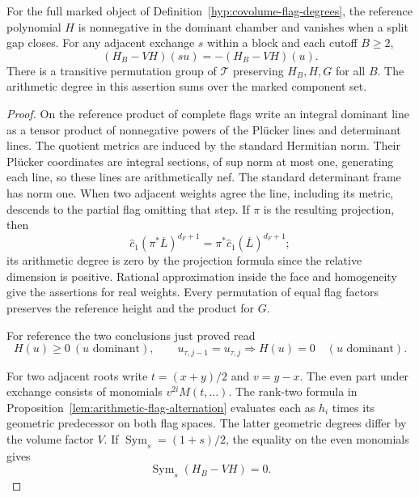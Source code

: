 \begin{established}\label{hyp:flag-wall-symmetry}
For the full marked object of Definition~\ref{hyp:covolume-flag-degrees}, the reference polynomial \(H\) is nonnegative in the dominant chamber and vanishes when a split gap closes. For any adjacent exchange \(s\) within a block and each cutoff \(B\ge2\),
\[
       (H_B-VH)(su)=-(H_B-VH)(u).
\]
There is a transitive permutation group of \(\mathcal T\) preserving \(H_B,H,G\) for all \(B\). The arithmetic degree in this assertion sums over the marked component set.
\label{cor:covolume-wall-shape-2}
\end{established}
\begin{proof}
On the reference product of complete flags write an integral dominant line as a tensor product of nonnegative powers of the Pl\"ucker lines and determinant lines. The quotient metrics are induced by the standard Hermitian norm. Their Pl\"ucker coordinates are integral sections, of sup norm at most one, generating each line, so these lines are arithmetically nef. The standard determinant frame has norm one. When two adjacent weights agree the line, including its metric, descends to the partial flag omitting that step. If \(\pi\) is the resulting projection, then
\[
 \widehat c_1(\pi^*\overline L)^{d_F+1}
           =\pi^*\widehat c_1(\overline L)^{d_F+1};
\]
its arithmetic degree is zero by the projection formula since the relative dimension is positive. Rational approximation inside the face and homogeneity give the assertions for real weights. Every permutation of equal flag factors preserves the reference height and the product for \(G\).

For reference the two conclusions just proved read
\[
       H(u)\ge0\ (u\text{ dominant}),\qquad
       u_{\tau,j-1}=u_{\tau,j}\Longrightarrow H(u)=0
       \quad(u\text{ dominant}).
\]

For two adjacent roots write \(t=(x+y)/2\) and \(v=y-x\). The even part under exchange consists of monomials \(v^{2i}M(t,\ldots)\). The rank-two formula in Proposition~\ref{lem:arithmetic-flag-alternation} evaluates each as \(h_i\) times its geometric predecessor on both flag spaces. The latter geometric degrees differ by the volume factor \(V\). If \(\operatorname{Sym}_s=(1+s)/2\), the equality on the even monomials gives
\[
             \operatorname{Sym}_s(H_B-VH)=0 .
\]


\end{proof}
